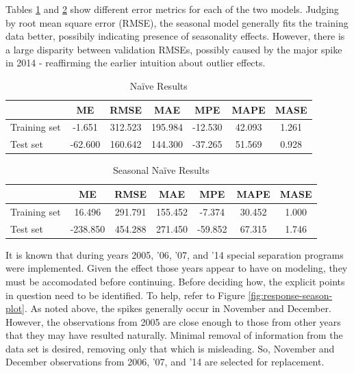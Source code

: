 \documentclass[12pt,letterpaper,toc=flat,oneside]{report}
\theoremstyle{definition}
\theoremstyle{definition}
\theoremstyle{definition}
\theoremstyle{remark}
\begin{document}
Tables \ref{tab:n-err} and \ref{tab:sn-err} show different error metrics
for each of the two models. Judging by root mean square error (RMSE),
the seasonal model generally fits the training data better, possibily
indicating presence of seasonality effects. However, there is a large
disparity between validation RMSEs, possibly caused by the major spike
in 2014 - reaffirming the earlier intuition about outlier effects.

\begin{table}[!h]

\caption{\label{tab:n-err}Na\"ive Results}
\centering
\begin{tabular}[t]{lcccccc}
\toprule
\bfseries{ } & \bfseries{ME} & \bfseries{RMSE} & \bfseries{MAE} & \bfseries{MPE} & \bfseries{MAPE} & \bfseries{MASE}\\
\midrule
Training set & -1.651 & 312.523 & 195.984 & -12.530 & 42.093 & 1.261\\
Test set & -62.600 & 160.642 & 144.300 & -37.265 & 51.569 & 0.928\\
\bottomrule
\end{tabular}
\end{table}\begin{table}[!h]

\caption{\label{tab:sn-err}Seasonal Na\"ive Results}
\centering
\begin{tabular}[t]{lcccccc}
\toprule
\bfseries{ } & \bfseries{ME} & \bfseries{RMSE} & \bfseries{MAE} & \bfseries{MPE} & \bfseries{MAPE} & \bfseries{MASE}\\
\midrule
Training set & 16.496 & 291.791 & 155.452 & -7.374 & 30.452 & 1.000\\
Test set & -238.850 & 454.288 & 271.450 & -59.852 & 67.315 & 1.746\\
\bottomrule
\end{tabular}
\end{table}

It is known that during years 2005, '06, '07, and '14 special separation
programs were implemented. Given the effect those years appear to have
on modeling, they must be accomodated before continuing. Before deciding
how, the explicit points in question need to be identified. To help,
refer to Figure \ref{fig:response-season-plot}. As noted above, the
spikes generally occur in November and December. However, the
observations from 2005 are close enough to those from other years that
they may have resulted naturally. Minimal removal of information from
the data set is desired, removing only that which is misleading. So,
November and December observations from 2006, '07, and '14 are selected
for replacement.
\end{document}
